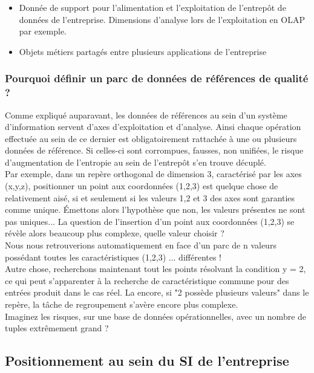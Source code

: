 \begin{itemize}
\item Donnée de support pour l'alimentation et l'exploitation de l'entrepôt de données de l'entreprise. Dimensions d'analyse lors de l'exploitation en OLAP par exemple.
\item Objets métiers partagés entre plusieurs applications de l'entreprise
\end{itemize}


\subsubsection{Pourquoi définir un parc de données de références de qualité ?}

Comme expliqué auparavant, les données de références au sein d'un système d'information servent d'axes d'exploitation et d'analyse. Ainsi chaque opération effectuée au sein de ce dernier est obligatoirement rattachée à une ou plusieurs données de référence. Si celles-ci sont corrompues, fausses, non unifiées, le risque d'augmentation de l'entropie au sein de l'entrepôt s'en trouve décuplé.\\
Par exemple, dans un repère orthogonal de dimension 3, caractérisé par les axes (x,y,z), positionner un point aux coordonnées (1,2,3) est quelque chose de relativement aisé, si et seulement si les valeurs 1,2 et 3 des axes sont garanties comme unique.
Émettons alors l'hypothèse que non, les valeurs présentes ne sont pas uniques... La question de l'insertion d'un point aux coordonnées (1,2,3) se révèle alors beaucoup plus complexe, quelle valeur choisir ? \\ 
Nous nous retrouverions automatiquement en face d'un parc de n valeurs possédant toutes les caractéristiques (1,2,3) ... différentes !\\
Autre chose, recherchons maintenant tout les points résolvant la condition y = 2, ce qui peut s'apparenter à la recherche de caractéristique commune pour des entrées produit dans le cas réel.
La encore, si "2 possède plusieurs valeurs" dans le repère, la tâche de regroupement s'avère encore plus complexe.\\
Imaginez les risques, sur une base de données opérationnelles, avec un nombre de tuples extrêmement grand ?\\

\subsection{Positionnement au sein du SI de l'entreprise}

